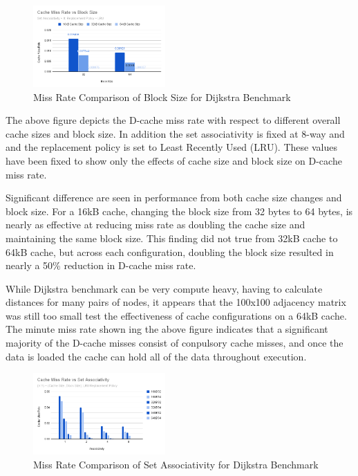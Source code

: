 \documentclass[conference]{IEEEtran}
\begin{document}
\begin{figure}[H]
  \centering
  \includegraphics[width=0.45\textwidth]{dijkstraFigures/CacheMissRatevsBlockSize.png}
  \caption{Miss Rate Comparison of Block Size for Dijkstra Benchmark}
  \label{fig:EmpC1-Training}
\end{figure}

The above figure depicts the D-cache miss rate with respect to different overall cache sizes and block size. In addition the set associativity is fixed at 8-way and and the replacement policy is set to Least Recently Used (LRU). These values have been fixed to show only the effects of cache size and block size on D-cache miss rate. 

Significant difference are seen in performance from both cache size changes and block size. For a 16kB cache, changing the block size from 32 bytes to 64 bytes, is nearly as effective at reducing miss rate as doubling the cache size and maintaining the same block size. This finding did not true from 32kB cache to 64kB cache, but across each configuration, doubling the block size resulted in nearly a 50\% reduction in D-cache miss rate.

While Dijkstra benchmark can be very compute heavy, having to calculate distances for many pairs of nodes, it appears that the 100x100 adjacency matrix was still too small test the effectiveness of cache configurations on a 64kB cache. The minute miss rate shown ing the above figure indicates that a significant majority of the D-cache misses consist of conpulsory cache misses, and once the data is loaded the cache can hold all of the data throughout execution.

\begin{figure}[H]
  \centering
  \includegraphics[width=0.45\textwidth]{dijkstraFigures/CacheMissRatevsSetAssociativity.png}
  \caption{Miss Rate Comparison of Set Associativity for Dijkstra Benchmark}
  \label{fig:EmpC1-Training}
\end{figure}
\end{document}
